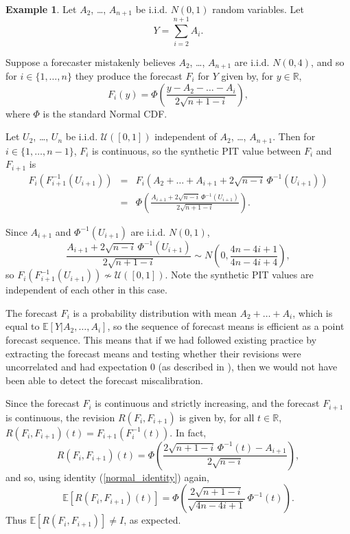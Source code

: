 \documentclass[aap]{imsart}
\theoremstyle{plain}
\theoremstyle{definition}
\newtheorem{example}[theorem]{Example}
\begin{document}
\begin{example}
Let $A_2$, \ldots, $A_{n+1}$ be i.i.d. $N(0,1)$ random variables. Let
\begin{equation*}
  Y = \sum_{i=2}^{n+1} A_i.
\end{equation*}

Suppose a forecaster mistakenly believes $A_2$, \ldots, $A_{n+1}$ are i.i.d. $N(0,4)$, and so for $i \in \{1, \ldots, n\}$ they produce the forecast $F_i$ for $Y$ given by, for $y \in \mathbb{R}$,
\begin{equation*}
  F_i(y) = \Phi\left(\frac{y - A_2 - \ldots - A_i}{2 \sqrt{n+1-i}}\right),
\end{equation*}
where $\Phi$ is the standard Normal CDF.

Let $U_2$, \ldots, $U_n$ be i.i.d. $\mathcal{U}([0,1])$ independent of $A_2$, \ldots, $A_{n+1}$. Then for $i \in \{1, \ldots, n-1\}$, $F_i$ is continuous, so the synthetic PIT value between $F_i$ and $F_{i+1}$ is
\begin{eqnarray*}
  F_i(F_{i+1}^{-1}(U_{i+1})) & = & F_i\left(A_2 + \ldots + A_{i+1} + 2 \sqrt{n-i} \,\Phi^{-1}(U_{i+1})\right) \\
                             & = & \Phi\left(\frac{A_{i+1} + 2 \sqrt{n-i} \,\Phi^{-1}(U_{i+1})}{2 \sqrt{n+1-i}}\right).
\end{eqnarray*}

Since $A_{i+1}$ and $\Phi^{-1}(U_{i+1})$ are i.i.d. $N(0,1)$,
\begin{equation*}
  \frac{A_{i+1} + 2\sqrt{n-i} \,\Phi^{-1}(U_{i+1})}{2 \sqrt{n+1-i}} \sim N\left(0, \frac{4n - 4i + 1}{4n - 4i + 4}\right),
\end{equation*}
so $F_i(F_{i+1}^{-1}(U_{i+1})) \nsim \mathcal{U}([0,1])$. Note the synthetic PIT values are independent of each other in this case.

The forecast $F_i$ is a probability distribution with mean $A_2 + \ldots + A_i$, which is equal to $\mathbb{E}[Y|A_2, \ldots, A_i]$, so the sequence of forecast means is efficient as a point forecast sequence. This means that if we had followed existing practice by extracting the forecast means and testing whether their revisions were uncorrelated and had expectation $0$ (as described in \cite{nrd87}), then we would not have been able to detect the forecast miscalibration.

Since the forecast $F_i$ is continuous and strictly increasing, and the forecast $F_{i+1}$ is continuous, the revision $R(F_i, F_{i+1})$ is given by, for all $t \in \mathbb{R}$, $R(F_i, F_{i+1})(t) = F_{i+1}(F_i^{-1}(t))$. In fact,
\begin{equation*}
  R(F_i, F_{i+1})(t) = \Phi\left(\frac{2\sqrt{n+1-i}\, \Phi^{-1}(t) - A_{i+1}}{2\sqrt{n-i}}\right),
\end{equation*}
and so, using identity (\ref{normal_identity}) again,
\begin{equation*}
  \mathbb{E}[R(F_i, F_{i+1})(t)] = \Phi\left(\frac{2\sqrt{n+1-i}}{\sqrt{4n-4i+1}}\, \Phi^{-1}(t)\right).
\end{equation*}
Thus $\mathbb{E}[R(F_i, F_{i+1})] \neq I$, as expected.
\end{example}
\end{document}
